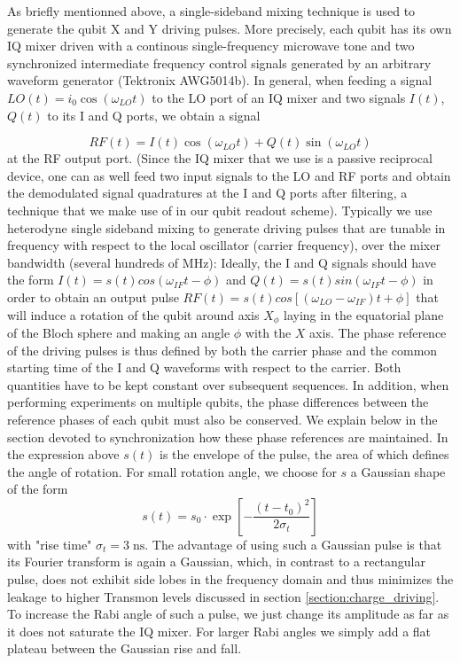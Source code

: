 As briefly mentionned above, a single-sideband mixing technique is used to generate the qubit X and Y driving pulses. More precisely, each qubit has its own IQ mixer driven with a continous single-frequency microwave tone and two synchronized intermediate frequency control signals generated by an arbitrary waveform generator (Tektronix AWG5014b). In general, when feeding a signal $LO(t) = i_0 \cos{(\omega_{LO} t )}$ to the LO port of an IQ mixer and two signals $I(t)$, $Q(t)$ to its I and Q ports, we obtain a signal

\begin{equation}
RF(t) = I(t)\cos{(\omega_{LO} t)}+Q(t)\sin{(\omega_{LO} t)} \label{eq:iqMixer}
\end{equation}
at the RF output port. (Since the IQ mixer that we use is a passive reciprocal device, one can as well feed two input signals to the LO and RF ports and obtain the demodulated signal quadratures at the I and Q ports after filtering, a technique that we make use of in our qubit readout scheme). Typically we use heterodyne single sideband mixing to generate driving pulses that are tunable in frequency with respect to the local oscillator (carrier  frequency), over the mixer bandwidth (several hundreds of MHz): Ideally, the I and Q signals should have the form $I(t)=s(t)cos(\omega_{IF} t-\phi)$ and $Q(t)=s(t)sin(\omega_{IF} t-\phi)$ in order to obtain an output pulse $RF(t)=s(t)cos[(\omega_{LO}-\omega_{IF})t +\phi]$ that will induce a rotation of the qubit around axis $X_{\phi}$ laying in the equatorial plane of the Bloch sphere and making an angle $\phi$ with the $X$ axis. The phase reference of the driving pulses is thus defined by both the carrier phase and the common starting time of the I and Q waveforms with respect to the carrier. Both quantities have to be kept constant over subsequent sequences. In addition, when performing experiments on multiple qubits, the phase differences between the reference phases of each qubit must also be conserved.  We explain below in the section devoted to synchronization how these phase references are maintained. In the expression above $s(t)$ is the envelope of the pulse, the area of which defines the angle of rotation. For small rotation angle, we choose for $s$ a Gaussian shape of the form
%
\begin{equation}
s(t) = s_0\cdot\exp{\left[-\frac{(t-t_0)^2}{2\sigma_t}\right]}
\end{equation}
%
with "rise time" $\sigma_t=3\;\mathrm{ns}$. The advantage of using such a Gaussian pulse \citep{bauer_gaussian_1984} is that its Fourier transform is again a Gaussian, which, in contrast to a rectangular pulse, does not exhibit side lobes in the frequency domain and thus minimizes the leakage to higher Transmon levels discussed in section \ref{section:charge_driving}. To increase the Rabi angle of such a pulse, we just change its amplitude as far as it does not saturate the IQ mixer. For larger Rabi angles we simply add a flat plateau between the Gaussian rise and fall.

